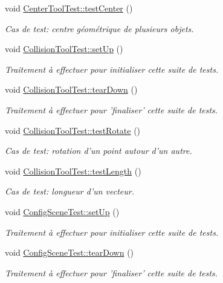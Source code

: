 \begin{DoxyCompactItemize}
void \hyperlink{group__inf2990_gab0e6197c88a207aacfd8e9d178a53a47}{Center\-Tool\-Test\-::test\-Center} ()
\begin{DoxyCompactList}\small\item\em Cas de test\-: centre géométrique de plusieurs objets. \end{DoxyCompactList}\item 
void \hyperlink{group__inf2990_ga6924da693899b253751b489928bd5e04}{Collision\-Tool\-Test\-::set\-Up} ()
\begin{DoxyCompactList}\small\item\em Traitement à effectuer pour initialiser cette suite de tests. \end{DoxyCompactList}\item 
void \hyperlink{group__inf2990_gae8e5960d925ec082674afdd45e7ea368}{Collision\-Tool\-Test\-::tear\-Down} ()
\begin{DoxyCompactList}\small\item\em Traitement à effectuer pour 'finaliser' cette suite de tests. \end{DoxyCompactList}\item 
void \hyperlink{group__inf2990_gabd062c4f55b2f09df44c6defd20bea7f}{Collision\-Tool\-Test\-::test\-Rotate} ()
\begin{DoxyCompactList}\small\item\em Cas de test\-: rotation d'un point autour d'un autre. \end{DoxyCompactList}\item 
void \hyperlink{group__inf2990_ga0951a401c6a0fb9bdd17c990827e6d57}{Collision\-Tool\-Test\-::test\-Length} ()
\begin{DoxyCompactList}\small\item\em Cas de test\-: longueur d'un vecteur. \end{DoxyCompactList}\item 
void \hyperlink{group__inf2990_ga707d7400843047e67b736ab79bafb5a0}{Config\-Scene\-Test\-::set\-Up} ()
\begin{DoxyCompactList}\small\item\em Traitement à effectuer pour initialiser cette suite de tests. \end{DoxyCompactList}\item 
void \hyperlink{group__inf2990_ga889ed3891c3e55280cabb982953906d9}{Config\-Scene\-Test\-::tear\-Down} ()
\begin{DoxyCompactList}\small\item\em Traitement à effectuer pour 'finaliser' cette suite de tests. \end{DoxyCompactList}\item 

\end{DoxyCompactItemize}

